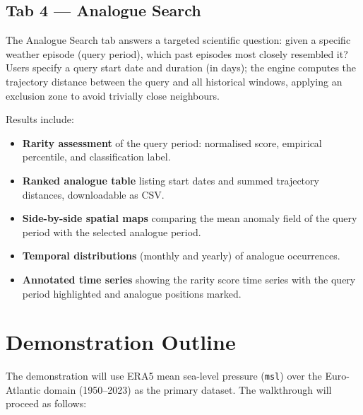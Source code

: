 \documentclass[runningheads]{llncs}
\begin{document}
\subsection{Tab 4 — Analogue Search}

The Analogue Search tab answers a targeted scientific question: given a
specific weather episode (query period), which past episodes most closely
resembled it?
Users specify a query start date and duration (in days); the engine computes
the trajectory distance between the query and all historical windows,
applying an exclusion zone to avoid trivially close neighbours.

Results include:
\begin{itemize}
  \item \textbf{Rarity assessment} of the query period: normalised score,
        empirical percentile, and classification label.
  \item \textbf{Ranked analogue table} listing start dates and summed
        trajectory distances, downloadable as CSV.
  \item \textbf{Side-by-side spatial maps} comparing the mean anomaly field
        of the query period with the selected analogue period.
  \item \textbf{Temporal distributions} (monthly and yearly) of analogue
        occurrences.
  \item \textbf{Annotated time series} showing the rarity score time series
        with the query period highlighted and analogue positions marked.
\end{itemize}

\section{Demonstration Outline}
\label{sec:demo}

The demonstration will use ERA5 mean sea-level pressure (\texttt{msl}) over
the Euro-Atlantic domain (1950–2023) as the primary dataset.
The walkthrough will proceed as follows:
\end{document}
